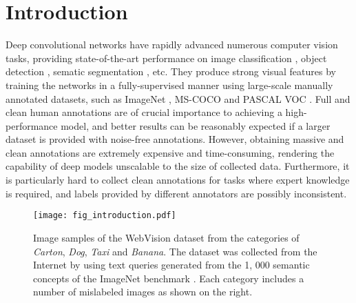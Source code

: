 \documentclass[runningheads]{llncs}
\begin{document}
\section{Introduction}
Deep convolutional networks have rapidly advanced numerous computer vision tasks, providing state-of-the-art performance on image classification \cite{HeK2016,SimonyanZ14a,SzegedyLJSRAEVR15,ioffe2015batch,Wang2017,Guo2017}, object detection \cite{Ren2015,redmon2016you,liu2016ssd,lin2017focal}, sematic segmentation \cite{long2015fully,hong2015decoupled,chen2016deeplab,he2017mask}, etc.  They produce strong visual features by training the networks in a fully-supervised manner using large-scale manually annotated datasets, such as ImageNet \cite{DengDSLL009}, MS-COCO \cite{lin2014microsoft} and  PASCAL VOC \cite{pascavoc}. Full and clean human annotations are of crucial importance to achieving a high-performance model, and better results can be reasonably expected if a larger dataset is provided with noise-free annotations. However, obtaining massive and clean annotations are extremely expensive and time-consuming, rendering the capability of deep models unscalable to the size of collected data. Furthermore, it is particularly hard to collect clean annotations for tasks where expert knowledge is required, and labels provided by different annotators are possibly inconsistent.

\begin{figure}[tb]
	\begin{center}
		\texttt{[image: fig\_introduction.pdf]}
	\end{center}
\vspace{-5mm}
	\caption{Image samples of the WebVision dataset \cite{li2017webvisiondata} from the categories of \emph{Carton}, \emph{Dog}, \emph{Taxi} and \emph{Banana}. The dataset was collected from the Internet by using text queries generated from the 1, 000 semantic concepts of the ImageNet benchmark \cite{DengDSLL009}. Each category includes a number of mislabeled images as shown on the right. }
	\label{fig:webvision_images}
\end{figure}
\end{document}
